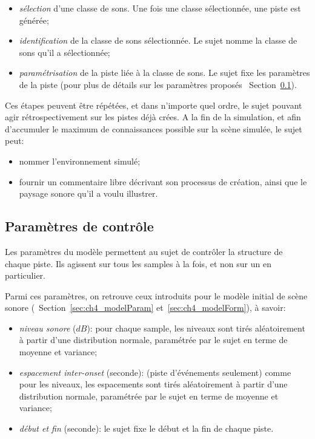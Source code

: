 \begin{itemize}
\item \emph{sélection} d'une classe de sons. Une fois une classe sélectionnée, une piste est générée; 
\item \emph{identification} de la classe de sons sélectionnée. Le sujet nomme la classe de sons qu'il a sélectionnée;
\item \emph{paramétrisation} de la piste liée à la classe de sons. Le sujet fixe les paramètres de la piste (pour plus de détails sur les paramètres proposés \cf~Section~\ref{sec:ch4_param}).
\end{itemize}

Ces étapes peuvent être répétées, et dans n'importe quel ordre, le sujet pouvant agir rétrospectivement sur les pistes déjà crées. A la fin de la simulation, et afin d'accumuler le maximum de connaissances possible sur la scène simulée, le sujet peut: 

\begin{itemize}
\item nommer l'environnement simulé;
\item fournir un commentaire libre décrivant son processus de création, ainsi que le paysage sonore qu'il a voulu illustrer.
\end{itemize}

\subsection{Paramètres de contrôle}
\label{sec:ch4_param}

Les paramètres du modèle permettent au sujet de contrôler la structure de chaque piste. Ils agissent sur tous les samples à la fois, et non sur un en particulier.

Parmi ces paramètres, on retrouve ceux introduits pour le modèle initial de scène sonore (\cf~Section~\ref{sec:ch4_modelParam} et~\ref{sec:ch4_modelForm}), à savoir:

\begin{itemize}
\item \emph{niveau sonore} ($dB$): pour chaque sample, les niveaux sont tirés aléatoirement à partir d'une distribution normale, paramétrée par le sujet en terme de moyenne et variance;
\item \emph{espacement inter-onset} (seconde): (piste d'événements seulement) comme pour les niveaux, les espacements sont tirés aléatoirement à partir d'une distribution normale, paramétrée par le sujet en terme de moyenne et variance;
\item \emph{début et fin} (seconde): le sujet fixe le début et la fin de chaque piste.
\end{itemize}

